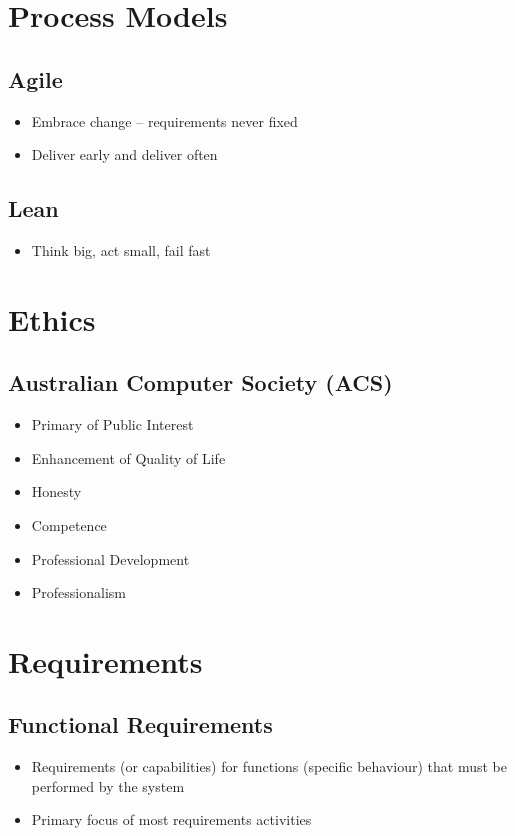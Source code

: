 \documentclass[10pt,a4paper]{article}
\begin{document}
\begin{landscape}
\begin{multicols}{3}

\section{Process Models}
\subsection{Agile}
\begin{itemize}
    \item Embrace change -- requirements never fixed
    \item Deliver early and deliver often
\end{itemize}
\subsection{Lean}
\begin{itemize}
    \item Think big, act small, fail fast
\end{itemize}

\section{Ethics}
\subsection{Australian Computer Society (ACS)}
\begin{itemize}
    \item Primary of Public Interest
    \item Enhancement of Quality of Life
    \item Honesty
    \item Competence
    \item Professional Development
    \item Professionalism
\end{itemize}

\section{Requirements}
\subsection{Functional Requirements}
\begin{itemize}
    \item Requirements (or capabilities) for functions (specific behaviour) that must be performed by the system
    \item Primary focus of most requirements activities
\end{itemize}

\end{multicols}
\end{landscape}
\end{document}
